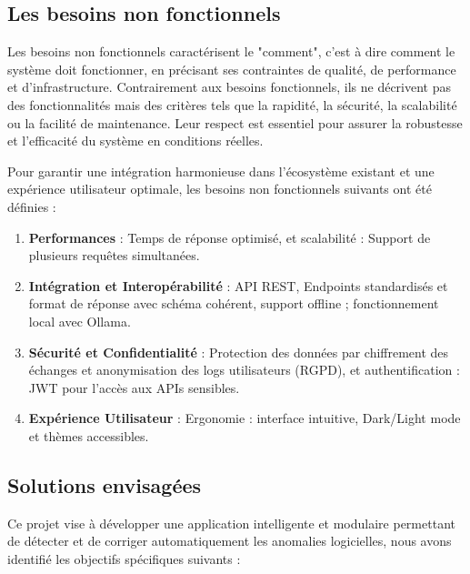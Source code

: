 \documentclass[12pt,a4paper]{report}
\begin{document}
	\subsection{Les besoins non fonctionnels}
	
	Les besoins non fonctionnels caractérisent le "comment", c'est à dire comment le système doit fonctionner, en précisant ses contraintes de qualité, de performance et d’infrastructure. Contrairement aux besoins fonctionnels, ils ne décrivent pas des fonctionnalités mais des critères tels que la rapidité, la sécurité, la scalabilité ou la facilité de maintenance. Leur respect est essentiel pour assurer la robustesse et l’efficacité du système en conditions réelles.
	
	Pour garantir une intégration harmonieuse dans l’écosystème existant et une expérience utilisateur optimale, les besoins non fonctionnels suivants ont été définies :
	
	\begin{enumerate}
		
		\item \textbf{Performances} : Temps de réponse optimisé, et scalabilité : Support de plusieurs requêtes simultanées.
		
		\item \textbf{Intégration et Interopérabilité} : API REST, Endpoints standardisés et format de réponse avec schéma cohérent, support offline ; fonctionnement local avec Ollama.
		
		\item \textbf{Sécurité et Confidentialité} : Protection des données par chiffrement des échanges et anonymisation des logs utilisateurs (RGPD), et authentification : JWT pour l’accès aux APIs sensibles.	
		
		\item \textbf{Expérience Utilisateur} : Ergonomie : interface intuitive, Dark/Light mode et thèmes accessibles.
		
		
	\end{enumerate}
	
	\subsection{Solutions envisagées}
	
	Ce projet vise à développer une application intelligente et modulaire permettant de détecter et de corriger automatiquement les anomalies logicielles, nous avons identifié les objectifs spécifiques suivants :
	
\end{document}
